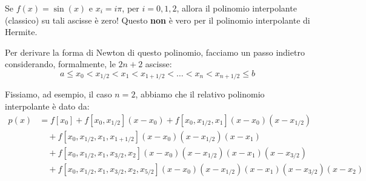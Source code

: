 \begin{center}
\end{center}

\vspace{0.4cm}
Se $f(x) = \sin(x)$ e $x_i = i\pi$, per $i=0, 1, 2$, allora il polinomio interpolante (classico) su tali ascisse è zero!
Questo \textbf{non} è vero per il polinomio interpolante di Hermite.









\vspace{0.4cm}
Per derivare la forma di Newton di questo polinomio, facciamo un passo indietro considerando, formalmente, le $2n+2$ ascisse:
$$ a \le x_0 < x_{1/2} < x_1 < x_{1+1/2} < \dots < x_n < x_{n+1/2} \le b $$

Fissiamo, ad esempio, il caso $n=2$, abbiamo che il relativo polinomio interpolante è dato da:
\begin{align*}
p(x) &= f[x_0] + f[x_0, x_{1/2}](x-x_0) + f[x_0, x_{1/2}, x_1](x-x_0)(x-x_{1/2}) \\
&\quad + f[x_0, x_{1/2}, x_1, x_{1+1/2}](x-x_0)(x-x_{1/2})(x-x_1) \\
&\quad + f[x_0, x_{1/2}, x_1, x_{3/2}, x_2](x-x_0)(x-x_{1/2})(x-x_1)(x-x_{3/2}) \\
&\quad + f[x_0, x_{1/2}, x_1, x_{3/2}, x_2, x_{5/2}](x-x_0)(x-x_{1/2})(x-x_1)(x-x_{3/2})(x-x_2)
\end{align*}

